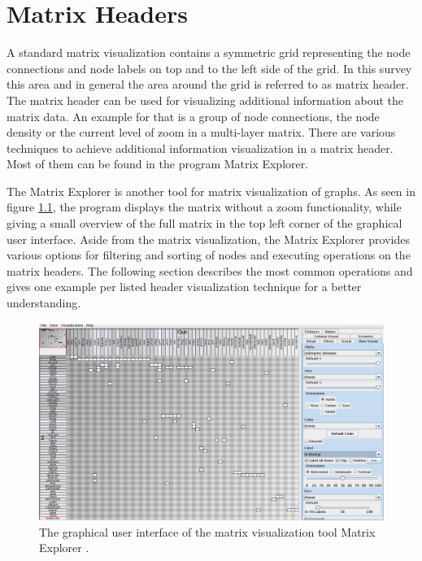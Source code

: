 %
%
% 
% 
% 


\chapter{Matrix Headers}
\label{chap:headers}

A standard matrix visualization contains a symmetric grid representing the node connections and node labels on top and to the left side of the grid. In this survey this area and in general the area around the grid is referred to as matrix header. The matrix header can be used for visualizing additional information about the matrix data. An example for that is a group of node connections, the node density or the current level of zoom in a multi-layer matrix.
There are various techniques to achieve additional information visualization in a matrix header. Most of them can be found in the program Matrix Explorer.

The Matrix Explorer is another tool for matrix visualization of graphs. As seen in figure \ref{fig:header_matrixexplorer}, the program displays the matrix without a zoom functionality, while giving a small overview of the full matrix in the top left corner of the graphical user interface. Aside from the matrix visualization, the Matrix Explorer provides various options for filtering and sorting of nodes and executing operations on the matrix headers. The following section describes the most common operations and gives one example per listed header visualization technique for a better understanding. 

\begin{figure}[tp]
  \centering
  \includegraphics[keepaspectratio,width=\hsize,height=\halfh]
  {images/Header_MatrixExplorer.png}
  
  \caption[Matrix Visualization Tool Matrix Explorer]{
  The graphical user interface of the matrix visualization tool Matrix Explorer \citep{henry-phd-2008}.
  }
  \label{fig:header_matrixexplorer}
\end{figure}

